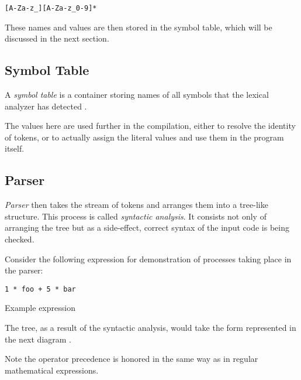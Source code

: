             \begin{center}\texttt{[A-Za-z\_][A-Za-z\_0-9]*}\end{center}

            These names and values are then stored in the symbol table, which will be discussed in the next section.

        \subsection{Symbol Table}

            A \emph{symbol table} is a container storing names of all symbols that the lexical analyzer has detected \cite{DragonBook}.

            The values here are used further in the compilation, either to resolve the identity of tokens, or to actually assign the literal values and use them in the program itself.

        \subsection{Parser}

            \emph{Parser} then takes the stream of tokens and arranges them into a tree-like structure. This process is called \emph{syntactic analysis}. It consists not only of arranging the tree but as a side-effect, correct syntax of the input code is being checked.

            Consider the following expression for demonstration of processes taking place in the parser:

            \begin{listing}
            \centering
            \texttt{1 * foo + 5 * bar}
            \caption{Example expression}\label{lst:expr}
            \end{listing}

            The tree, as a result of the syntactic analysis, would take the form represented in the next diagram \cite{CompilerDesignInC}.

            Note the operator precedence is honored in the same way as in regular mathematical expressions.

